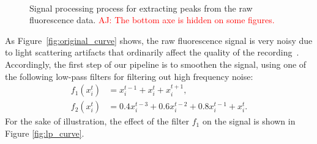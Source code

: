 \documentclass[wcp]{jmlr}
\begin{document}
\begin{figure}
\centering
{}
\\
\caption{Signal processing process for extracting peaks from the raw fluorescence data.
         \textcolor{red}{AJ: The bottom axe is hidden on some figures.}}
\label{fig:filtered-signal}
\end{figure}

As Figure~\ref{fig:original_curve} shows, the raw
fluorescence signal is very noisy due to light scattering artifacts that
ordinarily affect the quality of the recording~\citep{lichtman2011big}.
Accordingly, the first step of our pipeline is to smoothen the signal, using
one of the following low-pass filters for filtering out high frequency noise:
\begin{align}
f_1(x^t_i) &= x^{t-1}_i + x^t_i + x^{t+1}_i \label{eq:symetric-median}, \\
f_2(x^t_i) &= 0.4 x^{t-3}_i + 0.6 x^{t-2}_i + 0.8 x^{t-1}_i + x_i^t.
\label{eq:weighted-asymetric-median}
\end{align}
For the sake of illustration, the effect of the filter $f_1$ on the signal
is shown in Figure \ref{fig:lp_curve}.
\end{document}
